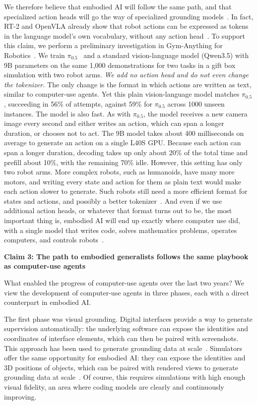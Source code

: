 \documentclass{article}
\begin{document}
We therefore believe that embodied AI will follow the same path, and that specialized action heads will go the way of specialized grounding models~\citep{goyal2025vla0,hancock2026vlm2vla}. In fact, RT-2 and OpenVLA already show that robot actions can be expressed as tokens in the language model's own vocabulary, without any action head~\citep{brohan2023rt2,kim2024openvla}. To support this claim, we perform a preliminary investigation in Gym-Anything for Robotics~\citep{aggarwal2026gymanythingrobotics}. We train $\pi_{0.5}$~\citep{black2025pi05} and a standard vision-language model (Qwen3.5) with 9B parameters on the same 1{,}000 demonstrations for two tasks in a gift box simulation with two robot arms. \textit{We add no action head and do not even change the tokenizer.} The only change is the format in which actions are written as text, similar to computer-use agents. Yet this plain vision-language model matches $\pi_{0.5}$, succeeding in 56\% of attempts, against 59\% for $\pi_{0.5}$ across 1000 unseen instances. The model is also fast. As with $\pi_{0.5}$, the model receives a new camera image every second and either writes an action, which can span a longer duration, or chooses not to act. The 9B model takes about 400 milliseconds on average to generate an action on a single L40S GPU. Because each action can span a longer duration, decoding takes up only about 20\% of the total time and prefill about 10\%, with the remaining 70\% idle. However, this setting has only two robot arms. More complex robots, such as humanoids, have many more motors, and writing every state and action for them as plain text would make each action slower to generate. Such robots still need a more efficient format for states and actions, and possibly a better tokenizer~\citep{pertsch2025fast,kawaharazuka2025vlareview}. And even if we use additional action heads, or whatever that format turns out to be, the most important thing is, embodied AI will end up exactly where computer use did, with a single model that writes code, solves mathematics problems, operates computers, and controls robots~\citep{yang2025magma,reed2022gato,gemini2025robotics}.

\textbf{Claim 3: The path to embodied generalists follows the same playbook as computer-use agents}

What enabled the progress of computer-use agents over the last two years? We view the development of computer-use agents in three phases, each with a direct counterpart in embodied AI.

The first phase was visual grounding. Digital interfaces provide a way to generate supervision automatically: the underlying software can expose the identities and coordinates of interface elements, which can then be paired with screenshots. This approach has been used to generate grounding data at scale~\citep{gou2025uground}. Simulators offer the same opportunity for embodied AI: they can expose the identities and 3D positions of objects, which can be paired with rendered views to generate grounding data at scale~\citep{yuan2024robopoint}. Of course, this requires simulations with high enough visual fidelity, an area where coding models are clearly and continuously improving.
\end{document}
